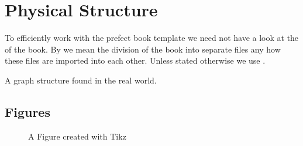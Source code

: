 \documentclass[crop=false,class=scrbook]{standalone}
\begin{document}
\chapter{Physical Structure}
To efficiently work with the prefect book template we need not have a look at
the  of the book.
By  we mean the division of the book into separate files any how these
files are imported into each other.
Unless stated otherwise we use .

\begin{Definition}[PNT]
	A graph structure found in the real world.
\end{Definition}

\section{Figures}
\begin{figure}
	
	\caption{A Figure created with Tikz}
	\label{fig:figure1}
\end{figure}
\end{document}
